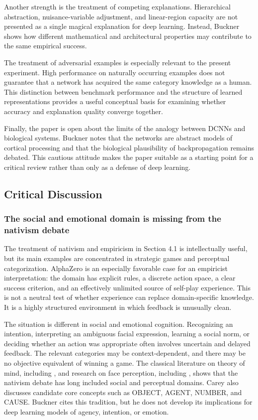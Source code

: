 \documentclass[11pt]{article}
\begin{document}
Another strength is the treatment of competing explanations. Hierarchical abstraction, nuisance-variable adjustment, and linear-region capacity are not presented as a single magical explanation for deep learning. Instead, Buckner shows how different mathematical and architectural properties may contribute to the same empirical success.

The treatment of adversarial examples is especially relevant to the present experiment. High performance on naturally occurring examples does not guarantee that a network has acquired the same category knowledge as a human. This distinction between benchmark performance and the structure of learned representations provides a useful conceptual basis for examining whether accuracy and explanation quality converge together.

Finally, the paper is open about the limits of the analogy between DCNNs and biological systems. Buckner notes that the networks are abstract models of cortical processing and that the biological plausibility of backpropagation remains debated. This cautious attitude makes the paper suitable as a starting point for a critical review rather than only as a defense of deep learning.

\subsection{Critical Discussion}

\subsubsection*{The social and emotional domain is missing from the nativism debate}

The treatment of nativism and empiricism in Section 4.1 is intellectually useful, but its main examples are concentrated in strategic games and perceptual categorization. AlphaZero is an especially favorable case for an empiricist interpretation: the domain has explicit rules, a discrete action space, a clear success criterion, and an effectively unlimited source of self-play experience. This is not a neutral test of whether experience can replace domain-specific knowledge. It is a highly structured environment in which feedback is unusually clean.

The situation is different in social and emotional cognition. Recognizing an intention, interpreting an ambiguous facial expression, learning a social norm, or deciding whether an action was appropriate often involves uncertain and delayed feedback. The relevant categories may be context-dependent, and there may be no objective equivalent of winning a game. The classical literature on theory of mind, including \citet{baron1985}, and research on face perception, including \citet{kanwisher1997}, shows that the nativism debate has long included social and perceptual domains. Carey \citep{carey2009} also discusses candidate core concepts such as OBJECT, AGENT, NUMBER, and CAUSE. Buckner cites this tradition, but he does not develop its implications for deep learning models of agency, intention, or emotion.
\end{document}
